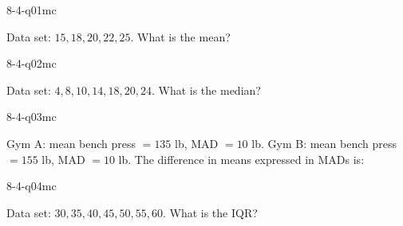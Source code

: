 

\begin{practiceQuestion}{8-4-q01}{mc}
\begin{questionText}
Data set: $15, 18, 20, 22, 25$. What is the mean?
\end{questionText}
\end{practiceQuestion}

\begin{practiceQuestion}{8-4-q02}{mc}
\begin{questionText}
Data set: $4, 8, 10, 14, 18, 20, 24$. What is the median?
\end{questionText}
\end{practiceQuestion}

\begin{practiceQuestion}{8-4-q03}{mc}
\begin{questionText}
Gym A: mean bench press $= 135$ lb, MAD $= 10$ lb. Gym B: mean bench press $= 155$ lb, MAD $= 10$ lb. The difference in means expressed in MADs is:
\end{questionText}
\end{practiceQuestion}

\begin{practiceQuestion}{8-4-q04}{mc}
\begin{questionText}
Data set: $30, 35, 40, 45, 50, 55, 60$. What is the IQR?
\end{questionText}
\end{practiceQuestion}

